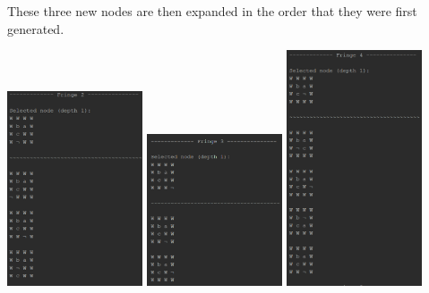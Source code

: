 \documentclass{article}
\begin{document}
	These three new nodes are then expanded in the order that they were first generated.
	\begin{multicols}{3}[\columnsep=2cm]
		\includegraphics[width=0.3\textwidth,keepaspectratio]{BFS-1-2-1.png}
		\columnbreak
		\includegraphics[width=0.3\textwidth,keepaspectratio]{BFS-1-2-2.png}
		\columnbreak
		\includegraphics[width=0.3\textwidth,keepaspectratio]{BFS-1-2-3.png}
	\end{multicols}
\end{document}
